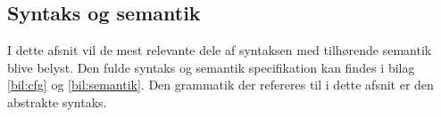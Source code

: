 \subsection{Syntaks og semantik}\label{sec:Syntax}
I dette afsnit vil de mest relevante dele af syntaksen med tilhørende semantik blive belyst. Den fulde syntaks og semantik specifikation kan findes i bilag \ref{bil:cfg} og \ref{bil:semantik}. Den grammatik der refereres til i dette afsnit er den abstrakte syntaks.



%

